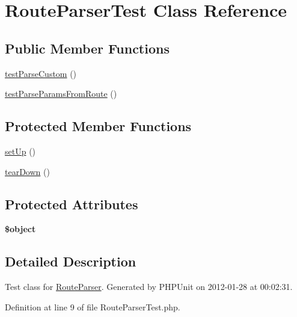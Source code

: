 \hypertarget{class_route_parser_test}{\section{\-Route\-Parser\-Test \-Class \-Reference}
\label{class_route_parser_test}
}
\subsection*{\-Public \-Member \-Functions}
\begin{DoxyCompactItemize}
\item 
\hyperlink{class_route_parser_test_a0a2c0f88e83f8335e09c1d5cde5a5b42}{test\-Parse\-Custom} ()
\item 
\hyperlink{class_route_parser_test_a67bef113f03b076d2d5832404daad188}{test\-Parse\-Params\-From\-Route} ()
\end{DoxyCompactItemize}
\subsection*{\-Protected \-Member \-Functions}
\begin{DoxyCompactItemize}
\item 
\hyperlink{class_route_parser_test_a0bc688732d2b3b162ffebaf7812e78da}{set\-Up} ()
\item 
\hyperlink{class_route_parser_test_a80fe3d17e658907fc75346a0ec9d6fc7}{tear\-Down} ()
\end{DoxyCompactItemize}
\subsection*{\-Protected \-Attributes}
\begin{DoxyCompactItemize}
\item 
\hypertarget{class_route_parser_test_a52123b83a1952a68c5513e47d59ec4a6}{{\bfseries \$object}}\label{class_route_parser_test_a52123b83a1952a68c5513e47d59ec4a6}

\end{DoxyCompactItemize}


\subsection{\-Detailed \-Description}
\-Test class for \hyperlink{class_route_parser}{\-Route\-Parser}. \-Generated by \-P\-H\-P\-Unit on 2012-\/01-\/28 at 00\-:02\-:31. 

\-Definition at line 9 of file \-Route\-Parser\-Test.\-php.



